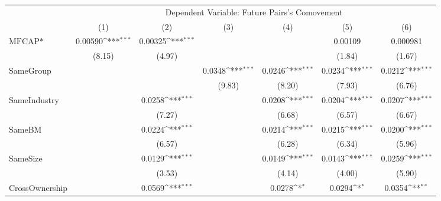 {
\def\sym#1{\ifmmode^{#1}\else\(^{#1}\)\fi}
\begin{tabular}{l*{6}{c}}
\hline\hline
                    &\multicolumn{6}{c}{Dependent Variable:  Future Pairs's Comovement}                                                                 \\\cmidrule(lr){2-7}
                    &\multicolumn{1}{c}{(1)}         &\multicolumn{1}{c}{(2)}         &\multicolumn{1}{c}{(3)}         &\multicolumn{1}{c}{(4)}         &\multicolumn{1}{c}{(5)}         &\multicolumn{1}{c}{(6)}         \\
\hline
$ \text{MFCAP*} $   &     0.00590\sym{***}&     0.00325\sym{***}&                     &                     &     0.00109         &    0.000981         \\
                    &      (8.15)         &      (4.97)         &                     &                     &      (1.84)         &      (1.67)         \\
[1em]
SameGroup           &                     &                     &      0.0348\sym{***}&      0.0246\sym{***}&      0.0234\sym{***}&      0.0212\sym{***}\\
                    &                     &                     &      (9.83)         &      (8.20)         &      (7.93)         &      (6.76)         \\
[1em]
SameIndustry        &                     &      0.0258\sym{***}&                     &      0.0208\sym{***}&      0.0204\sym{***}&      0.0207\sym{***}\\
                    &                     &      (7.27)         &                     &      (6.68)         &      (6.57)         &      (6.67)         \\
[1em]
SameBM              &                     &      0.0224\sym{***}&                     &      0.0214\sym{***}&      0.0215\sym{***}&      0.0200\sym{***}\\
                    &                     &      (6.57)         &                     &      (6.28)         &      (6.34)         &      (5.96)         \\
[1em]
SameSize            &                     &      0.0129\sym{***}&                     &      0.0149\sym{***}&      0.0143\sym{***}&      0.0259\sym{***}\\
                    &                     &      (3.53)         &                     &      (4.14)         &      (4.00)         &      (5.90)         \\
[1em]
CrossOwnership      &                     &      0.0569\sym{***}&                     &      0.0278\sym{*}  &      0.0294\sym{*}  &      0.0354\sym{**} \\

\end{tabular}}
